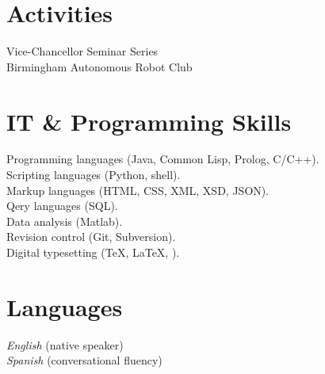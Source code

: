 \documentclass[10pt, a4paper]{article}
\begin{document}
\section*{Activities}
Vice-Chancellor Seminar Series\\
Birmingham Autonomous Robot Club


\section*{IT \& Programming Skills}
Programming languages (Java, Common Lisp, Prolog, C/C++).\\
Scripting languages (Python, shell).\\
Markup languages (HTML, CSS, XML, XSD, JSON).\\
Qery languages (SQL).\\
Data analysis (Matlab).\\
Revision control (Git, Subversion).\\
Digital typesetting (\TeX, \LaTeX, \XeTeX).

\section*{Languages}
\textit{English} (native speaker)\\
\textit{Spanish} (conversational fluency)
\end{document}

